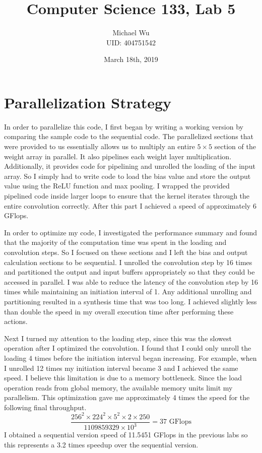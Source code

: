 \documentclass[12pt]{article}
\begin{document}
\title{Computer Science 133, Lab 5}
\date{March 18th, 2019}
\author{Michael Wu\\UID: 404751542}
\maketitle

\section{Parallelization Strategy}

In order to parallelize this code, I first began by writing a working version by comparing
the sample code to the sequential code. The parallelized sections that were provided to us
essentially allows us to multiply an entire \(5\times5\) section of the weight array in parallel.
It also pipelines each weight layer multiplication. Additionally, it provides code for
pipelining and unrolled the loading of the input array. So I simply had to write code to
load the bias value and store the output value using the ReLU function and max pooling.
I wrapped the provided pipelined code inside larger loops to ensure that the kernel
iterates through the entire convolution correctly. After this part I achieved a speed
of approximately \(6\) GFlops.

In order to optimize my code, I investigated the performance summary
and found that the majority of the computation time was spent in the loading and convolution
steps. So I focused on these sections and I left the bias and output calculation sections
to be sequential. I unrolled the convolution step by 16 times and partitioned the output and input
buffers appropriately so that they could be accessed in parallel. I was able to reduce the latency of
the convolution step by 16 times while maintaining an initiation interval of 1. Any additional
unrolling and partitioning resulted in a synthesis time that was too long. I achieved slightly less
than double the speed in my overall execution time after performing these actions.

Next I turned my attention to the loading step, since this was the slowest operation after I optimized
the convolution. I found that I could only unroll the loading 4 times before the initiation interval began
increasing. For example, when I unrolled 12 times my initiation interval became 3 and I achieved the
same speed. I believe this limitation is due to a memory bottleneck. Since the load operation reads from
global memory, the available memory units limit my parallelism. This optimization gave me approximately
4 times the speed for the following final throughput.
\[\frac{256^2\times 224^2\times 5^2\times 2\times 250}{1109859329\times 10^3}=37 \text{ GFlops}\]
I obtained a sequential version speed of 11.5451 GFlops in the previous labs
so this represents a 3.2 times speedup over the sequential version.
\end{document}
